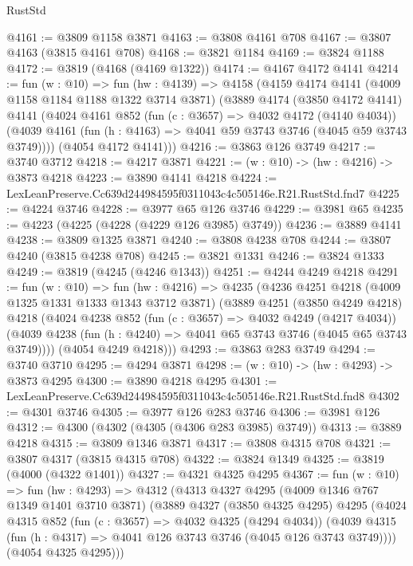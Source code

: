 \begin{lexlean}{RustStd}
\begin{coremodule}
@4161 := @3809 @1158 @3871
@4163 := @3808 @4161 @708
@4167 := @3807 @4163 (@3815 @4161 @708)
@4168 := @3821 @1184
@4169 := @3824 @1188
@4172 := @3819 (@4168 (@4169 @1322))
@4174 := @4167 @4172 @4141
@4214 := fun (w : @10) =>
  fun (hw : @4139) =>
  @4158
    (@4159
      @4174
      @4141
      (@4009 @1158 @1184 @1188 @1322 @3714 @3871)
      (@3889
        @4174
        (@3850 @4172 @4141)
        @4141
        (@4024
          @4161
          @852
          (fun (c : @3657) => @4032 @4172 (@4140 @4034))
          (@4039 @4161 (fun (h : @4163) => @4041 @59 @3743 @3746 (@4045 @59 @3743 @3749))))
        (@4054 @4172 @4141)))
@4216 := @3863 @126 @3749
@4217 := @3740 @3712
@4218 := @4217 @3871
@4221 := (w : @10) -> (hw : @4216) -> @3873 @4218
@4223 := @3890 @4141 @4218
@4224 := LexLeanPreserve.Cc639d244984595f0311043c4c505146e.R21.RustStd.fnd7
@4225 := @4224 @3746
@4228 := @3977 @65 @126 @3746
@4229 := @3981 @65
@4235 := @4223 (@4225 (@4228 (@4229 @126 @3985) @3749))
@4236 := @3889 @4141
@4238 := @3809 @1325 @3871
@4240 := @3808 @4238 @708
@4244 := @3807 @4240 (@3815 @4238 @708)
@4245 := @3821 @1331
@4246 := @3824 @1333
@4249 := @3819 (@4245 (@4246 @1343))
@4251 := @4244 @4249 @4218
@4291 := fun (w : @10) =>
  fun (hw : @4216) =>
  @4235
    (@4236
      @4251
      @4218
      (@4009 @1325 @1331 @1333 @1343 @3712 @3871)
      (@3889
        @4251
        (@3850 @4249 @4218)
        @4218
        (@4024
          @4238
          @852
          (fun (c : @3657) => @4032 @4249 (@4217 @4034))
          (@4039 @4238 (fun (h : @4240) => @4041 @65 @3743 @3746 (@4045 @65 @3743 @3749))))
        (@4054 @4249 @4218)))
@4293 := @3863 @283 @3749
@4294 := @3740 @3710
@4295 := @4294 @3871
@4298 := (w : @10) -> (hw : @4293) -> @3873 @4295
@4300 := @3890 @4218 @4295
@4301 := LexLeanPreserve.Cc639d244984595f0311043c4c505146e.R21.RustStd.fnd8
@4302 := @4301 @3746
@4305 := @3977 @126 @283 @3746
@4306 := @3981 @126
@4312 := @4300 (@4302 (@4305 (@4306 @283 @3985) @3749))
@4313 := @3889 @4218
@4315 := @3809 @1346 @3871
@4317 := @3808 @4315 @708
@4321 := @3807 @4317 (@3815 @4315 @708)
@4322 := @3824 @1349
@4325 := @3819 (@4000 (@4322 @1401))
@4327 := @4321 @4325 @4295
@4367 := fun (w : @10) =>
  fun (hw : @4293) =>
  @4312
    (@4313
      @4327
      @4295
      (@4009 @1346 @767 @1349 @1401 @3710 @3871)
      (@3889
        @4327
        (@3850 @4325 @4295)
        @4295
        (@4024
          @4315
          @852
          (fun (c : @3657) => @4032 @4325 (@4294 @4034))
          (@4039 @4315 (fun (h : @4317) => @4041 @126 @3743 @3746 (@4045 @126 @3743 @3749))))
        (@4054 @4325 @4295)))

\end{coremodule}
\end{lexlean}

